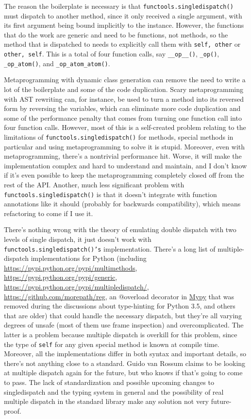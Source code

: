 \documentclass[12pt]{article}
\begin{document}
The reason the boilerplate is necessary is that
\texttt{functools.singledispatch()} must dispatch to another method,
since it only received a single argument, with its first argument
being bound implicitly to the instance.  However, the functions that
do the work are generic and need to be functions, not methods, so the
method that is dispatched to needs to explicitly call them with
\texttt{self, other} or \texttt{other, self}.  This is a total of four
function calls, say \texttt{\_\_op\_\_()}, \texttt{\_op()},
\texttt{\_op\_atom()}, and \texttt{\_op\_atom\_atom()}.

Metaprogramming with dynamic class generation can remove the need to
write a lot of the boilerplate and some of the code duplication.
Scary metaprogramming with AST rewriting can, for instance, be used to
turn a method into its reversed form by reversing the variables, which
can eliminate more code duplication and some of the performance
penalty that comes from turning one function call into four function
calls.  However, most of this is a self-created problem relating to
the limitations of \texttt{functools.singledispatch()} for methods,
special methods in particular and using metaprogramming to solve it is
stupid.  Moreover, even with metaprogramming, there's a nontrivial
performance hit.  Worse, it will make the implementation complex and
hard to understand and maintain, and I don't know if it's even
possible to keep the metaprogramming completely closed off from the
rest of the API.  Another, much less significant problem with
\texttt{functools.singledispatch()} is that it doesn't integrate with
function annotations like it should (probably for backwards
compatibility), which means refactoring to come if I use it.

There's nothing wrong with the theory of emulating double dispatch
with two levels of single dispatch, it just doesn't work with
\texttt{functools.singledispatch()'s} implementation.  There's a long
list of multiple-dispatch implementations for Python (including
\url{https://pypi.python.org/pypi/multimethods},
\url{https://pypi.python.org/pypi/generic},
\url{https://pypi.python.org/pypi/multipledispatch/},
\url{https://github.com/morepath/reg}, an @overload decorator in
\href{http://mypy-lang.org/}{Mypy} that was removed during the
discussions about type-hinting for Python 3.5, and others that are
older) that could handle the necessary dispatch, but they're all
varying degrees of unsafe (most of them use frame inspection) and
overcomplicated.  The latter is a problem because multiple dispatch is
overkill for this problem, since the type of \texttt{self} for any
given special method is known at compile time.  Moreover, all the
implementations differ in both syntax and important details, so
there's not anything close to a standard.  Guido van Rossum claims to
be looking at multiple dispatch again for the future, but who knows if
that's going to come to pass.  The lack of standardization and
possible upcoming changes to singledispatch and the typing system in
general and the possibility of real multiple dispatch in the standard
library make any solution not very future-proof.
\end{document}
